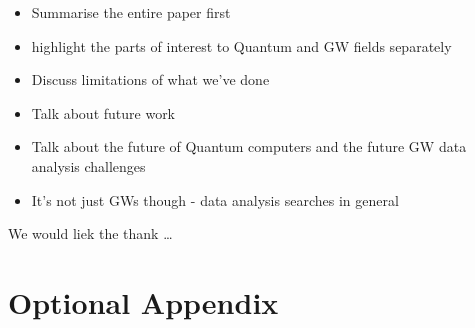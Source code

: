 \documentclass[aps,prd,nofootinbib,twocolumn,reprint,superscriptaddress,showpacs,showkeys,longbibliography]{revtex4-1}
\begin{document}
\begin{itemize}
\item Summarise the entire paper first
\item highlight the parts of interest to Quantum and GW fields separately
\item Discuss limitations of what we've done
\item Talk about future work
\item Talk about the future of Quantum computers and the future GW data
analysis challenges
\item It's not just GWs though - data analysis searches in general
\end{itemize}

\begin{acknowledgments}
We would liek the thank \ldots
\end{acknowledgments}


\appendix

\section{Optional Appendix\label{sec:appendix}}



\end{document}
